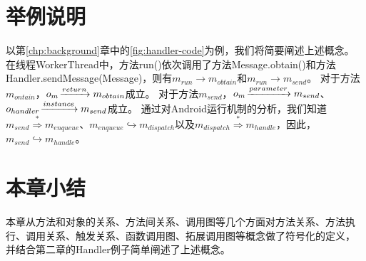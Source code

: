 	
\section{举例说明}

以第\ref{chp:background}章中的\autoref{fig:handler-code}为例，我们将简要阐述上述概念。
在线程WorkerThread中，方法run()依次调用了方法Message.obtain()和方法Handler.sendMessage(Message)，则有$m_{run} \to m_{obtain} $和$m_{run} \to m_{send}$。
对于方法$m_{ontain}$，$o_{m} \joinrel\xrightarrow{return} m_{obtain} $成立。
对于方法$m_{send}$，$o_{m} \joinrel\xrightarrow{parameter} m_{send} $、$o_{handler} \joinrel\xrightarrow{instance} m_{send} $成立。
通过对Android运行机制的分析，我们知道$m_{send} \stackrel{\ast	}{\Rightarrow} m_{enqueue} $、$m_{enqueue} \hookrightarrow m_{dispatch}$以及$m_{dispatch} \stackrel{\ast}{\Rightarrow}  m_{handle}$，因此，$m_{send} \hookrightarrow m_{handle}$。


\section{本章小结}

本章从方法和对象的关系、方法间关系、调用图等几个方面对方法关系、方法执行、调用关系、触发关系、函数调用图、拓展调用图等概念做了符号化的定义，
并结合第二章的Handler例子简单阐述了上述概念。
